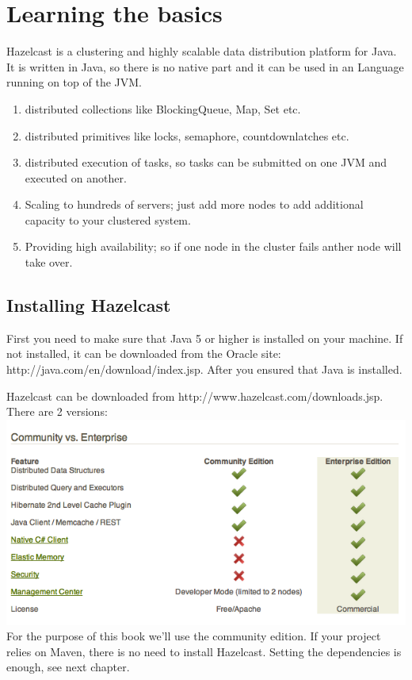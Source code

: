 \chapter{Learning the basics}
Hazelcast is a clustering and highly scalable data distribution platform for Java. It is written in Java, so there is no native part and it can be used in an Language running on top of the JVM.

\begin{enumerate}
  \item distributed collections like BlockingQueue, Map, Set etc.
  \item distributed primitives like locks, semaphore, countdownlatches etc.
  \item distributed execution of tasks, so tasks can be submitted on one JVM and executed 
        on another.
  \item Scaling to hundreds of servers; just add more nodes to add additional capacity to your clustered system.
  \item Providing high availability; so if one node in the cluster fails anther node will take over.
\end{enumerate}

\section{Installing Hazelcast}
First you need to make sure that Java 5 or higher is installed on your machine. If not installed, it can be downloaded from the Oracle site: http://java.com/en/download/index.jsp. After you ensured that Java is installed.

Hazelcast can be downloaded from http://www.hazelcast.com/downloads.jsp. There are 2 versions:
\includegraphics[scale=0.60]{hazelcast-editions.png}
For the purpose of this book we'll use the community edition. If your project relies on Maven, there is no need to install Hazelcast. Setting the dependencies is enough, see next chapter.

